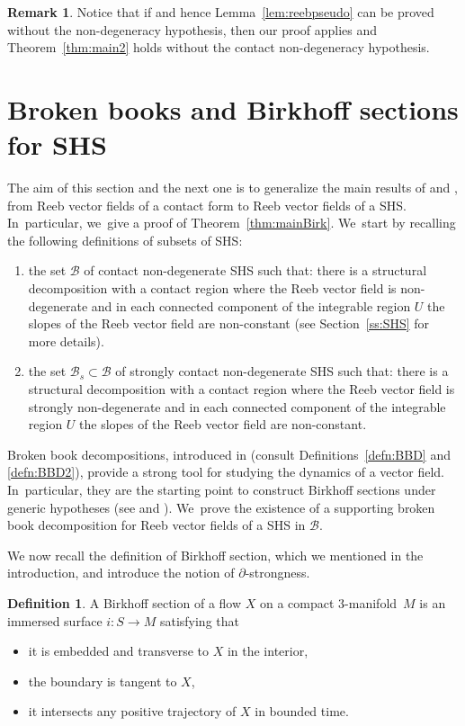 \documentclass[11pt]{article}
\newcommand{\threemanifold}{$3$\nobreakdash-mani\-fold\xspace}
\theoremstyle{definition}
\newtheorem{defi}[theorem]{Definition}
\newtheorem{Remark}[theorem]{Remark}
\begin{document}
\begin{Remark}\label{rem:degeneratecase}
Notice that if \cite[Th.\,1.2]{CDR} and hence Lemma~\ref{lem:reebpseudo} can be proved without the non-degeneracy hypothesis, then our proof applies and Theorem~\ref{thm:main2} holds without the contact non-degeneracy hypothesis.
\end{Remark}

\section{Broken books and Birkhoff sections for SHS}\label{s:SHSsections}

The aim of this section and the next one is to generalize the main results of \cite{CDR} and \cite{CDHR, CM}, from Reeb vector fields of a contact form to Reeb vector fields of a SHS. In~particular, we~give a proof of Theorem~\ref{thm:mainBirk}. We~start by recalling the following definitions of subsets of SHS:
\begin{enumerate}
\item the set $\mathcal{B}$ of contact non-degenerate SHS such that: there is a structural decomposition with a contact region where the Reeb vector field is non-degenerate and in each connected component of the integrable region $U$ the slopes of the Reeb vector field are non-constant (see Section~\ref{ss:SHS} for more details).
\item the set $\mathcal{B}_s\subset \mathcal{B}$ of strongly contact non-degenerate SHS such that: there is a structural decomposition with a contact region where the Reeb vector field is strongly non-degenerate and in each connected component of the integrable region $U$ the slopes of the Reeb vector field are non-constant.
\end{enumerate}

Broken book decompositions, introduced in \cite{CDR} (consult Definitions~\ref{defn:BBD} and \ref{defn:BBD2}), provide a strong tool for studying the dynamics of a vector field. In~particular, they are the starting point to construct Birkhoff sections under generic hypotheses (see \cite{CDHR} and \cite{CM}). We~prove the existence of a supporting broken book decomposition for Reeb vector fields of a SHS in $\mathcal{B}$.

We now recall the definition of Birkhoff section, which we mentioned in the introduction, and introduce the notion of $\partial$-strongness.

\begin{defi}
A Birkhoff section of a flow $X$ on a compact \threemanifold~$M$ is an immersed surface $i:S \to M$ satisfying that
\begin{itemize}
\item
it is embedded and transverse to $X$ in the interior,
\item
the boundary is tangent to $X$,
\item
it intersects any positive trajectory of $X$ in bounded time.
\end{itemize}
\end{defi}
\end{document}
